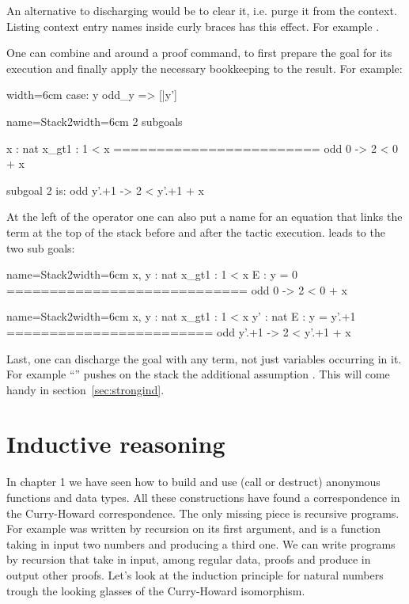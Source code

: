 An alternative to discharging  would be to clear it, i.e. purge it
from the context.  Listing context entry names inside curly braces has this
effect.  For example .

One can combine \C{:} and \C{=>} around a proof command, to first prepare the
goal for its execution and finally apply the necessary bookkeeping to the
result.  For example:

\begin{coq}{}{width=6cm}
case: y odd_y => [|y']
\end{coq}
\begin{coqout}{name=Stack2}{width=6cm}
2 subgoals

  x : nat
  x_gt1 : 1 < x
  ========================
   odd 0 -> 2 < 0 + x

subgoal 2 is:
 odd y'.+1 -> 2 < y'.+1 + x
\end{coqout}

At the left of the \C{:} operator one can also put a name for an
equation that links the term at the top of the stack before and
after the tactic execution.   leads to
the two sub goals:

\begin{coqout}{name=Stack2}{width=6cm}
 x, y : nat
 x_gt1 : 1 < x
 E : y = 0
============================
 odd 0 -> 2 < 0 + x
\end{coqout}
\begin{coqout}{name=Stack2}{width=6cm}
 x, y : nat
 x_gt1 : 1 < x
 y' : nat
 E : y = y'.+1
========================
 odd y'.+1 -> 2 < y'.+1 + x
\end{coqout}

Last, one can discharge the goal with any term, not
just variables occurring in it.  For example
``'' pushes on the stack
the additional assumption .  This
will come handy in section~\ref{sec:strongind}.

\section{Inductive reasoning}\label{sec:indreason}

In chapter 1 we have seen how to build and use (call or destruct)
anonymous functions and data types.  All these
constructions have found a correspondence in the Curry-Howard correspondence.
The only missing piece is recursive programs.  For example
 was written by recursion on its first argument, and is a
function taking in input two numbers and producing a third one.
We can write programs by recursion that take in input, among regular  data,
proofs and produce in output other proofs.  Let's look at the
induction principle for natural numbers trough the looking glasses of the
Curry-Howard isomorphism.

